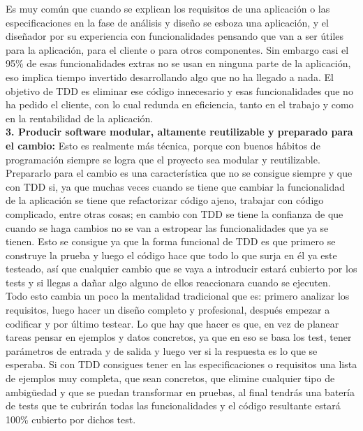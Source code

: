 \begin{flushleft}
\begin{itemize}
Es muy común que cuando se explican los requisitos de una aplicación o las especificaciones en la fase de análisis y diseño se esboza una aplicación, y el diseñador por su experiencia con funcionalidades pensando que van a ser útiles para la aplicación, para el cliente o para otros componentes. Sin embargo casi el 95\% de esas funcionalidades extras no se usan en ninguna parte de la aplicación, eso implica tiempo invertido desarrollando algo que no ha llegado a nada. El objetivo de TDD es eliminar ese código innecesario y esas funcionalidades que no ha pedido el cliente, con lo cual redunda en eficiencia, tanto en el trabajo y como en la rentabilidad de la aplicación.
\textbf{}\\
\textbf{3.	Producir software modular, altamente reutilizable y preparado para el cambio:}
Esto es realmente más técnica, porque con buenos hábitos de programación siempre se logra que el proyecto sea modular y reutilizable. Prepararlo para el cambio es una característica que no se consigue siempre y que con TDD si, ya que muchas veces cuando se tiene que cambiar la funcionalidad de la aplicación se tiene que refactorizar código ajeno, trabajar con código complicado, entre otras cosas; en cambio con TDD se tiene la confianza de que cuando se haga cambios no se van a estropear las funcionalidades que ya se tienen. Esto se consigue ya que la forma funcional de TDD es que primero se construye la prueba y luego el código hace que todo lo que surja en él ya este testeado, así que cualquier cambio que se vaya a introducir estará cubierto por los tests y si llegas a dañar algo alguno de ellos reaccionara cuando se ejecuten.
\textbf{}\\
Todo esto cambia un poco la mentalidad tradicional que es: primero analizar los requisitos, luego hacer un diseño completo y profesional, después empezar a codificar y por último testear. Lo que hay que hacer es que, en vez de planear tareas pensar en ejemplos y datos concretos, ya que en eso se basa los test, tener parámetros de entrada y de salida y luego ver si la respuesta es lo que se esperaba.
Si con TDD consigues tener en las especificaciones o requisitos una lista de ejemplos muy completa, que sean concretos, que elimine cualquier tipo de ambigüedad y que se puedan transformar en pruebas, al final tendrás una batería de tests que te cubrirán todas las funcionalidades y el código resultante estará 100\% cubierto por dichos test.




\end{itemize} 







\end{flushleft}